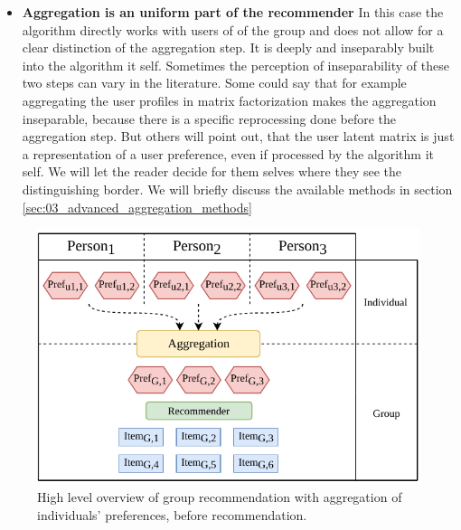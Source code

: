 \begin{itemize}
    \item \textbf{Aggregation is an uniform part of the recommender} \newline
    In this case the algorithm directly works with users of of the group and does not allow for a clear distinction of the aggregation step. It is deeply and inseparably built into the algorithm it self. Sometimes the perception of inseparability of these two steps can vary in the literature. Some could say that for example aggregating the user profiles in matrix factorization makes the aggregation inseparable, because there is a specific reprocessing done before the aggregation step. But others will point out, that the user latent matrix is just a representation of a user preference, even if processed by the algorithm it self. We will let the reader decide for them selves where they see the distinguishing border. We will briefly discuss the available methods in section \ref{sec:03_advanced_aggregation_methods}
\end{itemize}

\begin{figure}[htbp]
    \centering
    \includegraphics{img/before-rec-aggregation.pdf}
    \caption{High level overview of group recommendation with aggregation of individuals' preferences, before recommendation.}
    \label{fig:before_rec_agg}
\end{figure}

